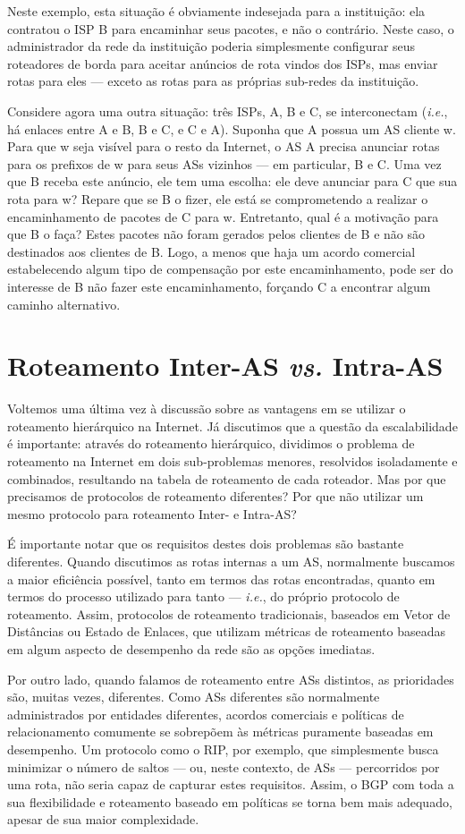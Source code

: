 \documentclass{article}
\begin{document}
Neste exemplo, esta situação é obviamente indesejada para a instituição: ela contratou o ISP B para encaminhar seus pacotes, e não o contrário. Neste caso, o administrador da rede da instituição poderia simplesmente configurar seus roteadores de borda para aceitar anúncios de rota vindos dos ISPs, mas enviar rotas para eles --- exceto as rotas para as próprias sub-redes da instituição.

Considere agora uma outra situação: três ISPs, A, B e C, se interconectam (\textit{i.e.}, há enlaces entre A e B, B e C, e C e A). Suponha que A possua um AS cliente w. Para que w seja visível para o resto da Internet, o AS A precisa anunciar rotas para os prefixos de w para seus ASs vizinhos --- em particular, B e C. Uma vez que B receba este anúncio, ele tem uma escolha: ele deve anunciar para C que sua rota para w? Repare que se B o fizer, ele está se comprometendo a realizar o encaminhamento de pacotes de C para w. Entretanto, qual é a motivação para que B o faça? Estes pacotes não foram gerados pelos clientes de B e não são destinados aos clientes de B. Logo, a menos que haja um acordo comercial estabelecendo algum tipo de compensação por este encaminhamento, pode ser do interesse de B não fazer este encaminhamento, forçando C a encontrar algum caminho alternativo.

\section{Roteamento Inter-AS \textit{vs.} Intra-AS}

Voltemos uma última vez à discussão sobre as vantagens em se utilizar o roteamento hierárquico na Internet. Já discutimos que a questão da escalabilidade é importante: através do roteamento hierárquico, dividimos o problema de roteamento na Internet em dois sub-problemas menores, resolvidos isoladamente e combinados, resultando na tabela de roteamento de cada roteador. Mas por que precisamos de protocolos de roteamento diferentes? Por que não utilizar um mesmo protocolo para roteamento Inter- e Intra-AS?

É importante notar que os requisitos destes dois problemas são bastante diferentes. Quando discutimos as rotas internas a um AS, normalmente buscamos a maior eficiência possível, tanto em termos das rotas encontradas, quanto em termos do processo utilizado para tanto --- \textit{i.e.}, do próprio protocolo de roteamento. Assim, protocolos de roteamento tradicionais, baseados em Vetor de Distâncias ou Estado de Enlaces, que utilizam métricas de roteamento baseadas em algum aspecto de desempenho da rede são as opções imediatas.

Por outro lado, quando falamos de roteamento entre ASs distintos, as prioridades são, muitas vezes, diferentes. Como ASs diferentes são normalmente administrados por entidades diferentes, acordos comerciais e políticas de relacionamento comumente se sobrepõem às métricas puramente baseadas em desempenho. Um protocolo como o RIP, por exemplo, que simplesmente busca minimizar o número de saltos --- ou, neste contexto, de ASs --- percorridos por uma rota, não seria capaz de capturar estes requisitos. Assim, o BGP com toda a sua flexibilidade e roteamento baseado em políticas se torna bem mais adequado, apesar de sua maior complexidade.
\end{document}
